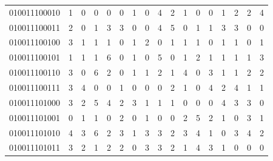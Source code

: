 \documentclass[10pt,a4paper]{article}
\begin{document}
\begin{longtable}{ |c|c|c|c|c|c|c|c|c|c|c|c|c|c|c|c|c| }
    010011100010              & 1                            & 0                                & 0                            & 0                              & 0   & 1   & 0   & 4   & 2   & 1   & 0   & 0   & 1   & 2   & 2   & 4   \\
    010011100011              & 2                            & 0                                & 1                            & 3                              & 3   & 0   & 0   & 4   & 5   & 0   & 1   & 1   & 3   & 3   & 0   & 0   \\
    010011100100              & 3                            & 1                                & 1                            & 1                              & 0   & 1   & 2   & 0   & 1   & 1   & 1   & 0   & 1   & 1   & 0   & 1   \\
    010011100101              & 1                            & 1                                & 1                            & 6                              & 0   & 1   & 0   & 5   & 0   & 1   & 2   & 1   & 1   & 1   & 1   & 3   \\
    010011100110              & 3                            & 0                                & 6                            & 2                              & 0   & 1   & 1   & 2   & 1   & 4   & 0   & 3   & 1   & 1   & 2   & 2   \\
    010011100111              & 3                            & 4                                & 0                            & 0                              & 1   & 0   & 0   & 0   & 2   & 1   & 0   & 4   & 2   & 4   & 1   & 1   \\
    010011101000              & 3                            & 2                                & 5                            & 4                              & 2   & 3   & 1   & 1   & 1   & 0   & 0   & 0   & 4   & 3   & 3   & 0   \\
    010011101001              & 0                            & 1                                & 1                            & 0                              & 2   & 0   & 1   & 0   & 0   & 2   & 5   & 2   & 1   & 0   & 3   & 1   \\
    010011101010              & 4                            & 3                                & 6                            & 2                              & 3   & 1   & 3   & 3   & 2   & 3   & 4   & 1   & 0   & 3   & 4   & 2   \\
    010011101011              & 3                            & 2                                & 1                            & 2                              & 2   & 0   & 3   & 3   & 2   & 1   & 4   & 3   & 1   & 0   & 0   & 0   \\

\end{longtable}
\end{document}
